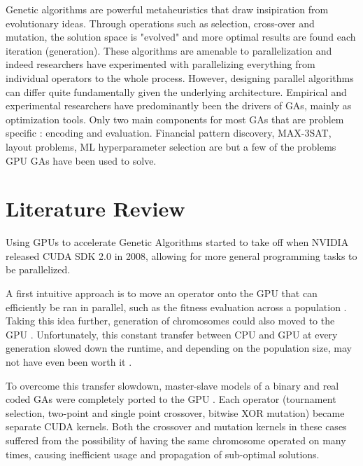 \documentclass[11pt]{article}       %
\begin{document}
Genetic algorithms are powerful metaheuristics that draw insipiration from evolutionary ideas. Through operations such as selection, cross-over and mutation, the solution space is "evolved" and more optimal results are found each iteration (generation). These algorithms are amenable to parallelization and indeed researchers have experimented with parallelizing everything from individual operators to the whole process. However, designing parallel algorithms can differ quite fundamentally given the underlying architecture. 
Empirical and experimental researchers have predominantly been the drivers of GAs, mainly as optimization tools. 
Only two main components for most GAs that are problem specific : encoding and evaluation.
Financial pattern discovery, MAX-3SAT, layout problems, ML hyperparameter selection \cite{} are but a few of the problems GPU GAs have been used to solve.

\section{Literature Review} \label{litrev}

Using GPUs to accelerate Genetic Algorithms started to take off when NVIDIA released CUDA SDK 2.0 in 2008, allowing for more general programming tasks to be parallelized.  

A first intuitive approach is to move an operator onto the GPU that can efficiently be ran in parallel, such as the fitness evaluation across a population \cite{Maitre2009-wd}. Taking this idea further, generation of chromosomes could also moved to the GPU \cite{Cavuoti2013-oy}. Unfortunately, this constant transfer between CPU and GPU at every generation slowed down the runtime, and depending on the population size, may not have even been worth it \cite{robilliard2008population}. 

To overcome this transfer slowdown, master-slave models of a binary and real coded GAs were completely ported to the GPU \cite{Debattisti2009-su, Arora2010-ds}. Each operator (tournament selection, two-point and single point crossover, bitwise XOR mutation) became separate CUDA kernels. Both the crossover and mutation kernels in these cases suffered from the possibility of having the same chromosome operated on many times, causing inefficient usage and propagation of sub-optimal solutions.
\end{document}
